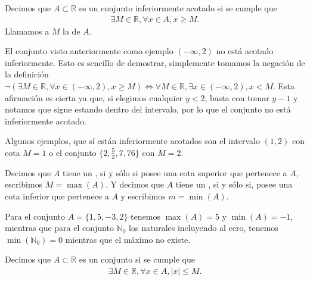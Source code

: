 \documentclass[12pt]{book}
\begin{document}
\begin{definitionenv}
     Decimos que $A\subset \mathbb{R}$ es un conjunto inferiormente acotado si se cumple que
    \begin{align*}
        \exists M\in \mathbb{R},\forall x \in A, x\ge M.
    \end{align*}
    Llamamos a $M$ la  de $A$.
\end{definitionenv}

\begin{exampleenv}
    El conjunto visto anteriormente como ejemplo $(-\infty,2)$ no está acotado inferiormente. Esto es sencillo de demostrar, simplemente tomamos la negación de la definición $\neg(\exists M\in \mathbb{R},\forall x \in (-\infty,2), x\ge M)\iff\forall M\in\mathbb{R},\exists x\in (-\infty,2), x< M$. Esta afirmación es cierta ya que, si elegimos cualquier $y<2$, basta con tomar $y-1$ y notamos que sigue estando dentro del intervalo, por lo que el conjunto no está inferiormente acotado.
\end{exampleenv}

\begin{exampleenv}
    Algunos ejemplos, que sí están inferiormente acotados son el intervalo $(1,2)$ con cota $M=1$ o el conjunto $\{2,\frac{5}{2},7,76\}$ con $M=2$.
\end{exampleenv}

\begin{definitionenv}
    Decimos que $A$ tiene un , si y sólo si posee una cota superior que pertenece a $A$, escribimos $M=\max(A)$. Y decimos que $A$ tiene un , si y sólo si, posee una cota inferior que pertenece a $A$ y escribimos $m=\min(A)$. 
\end{definitionenv}

\begin{exampleenv}
    Para el conjunto $A = \{1,5,-3,2\}$ tenemos $\max(A)=5$ y $\min(A)=-1$, mientras que para el conjunto $\mathbb{N}_0$ los naturales incluyendo al cero, tenemos $\min(\mathbb{N}_0)=0$ mientras que el máximo no existe.
\end{exampleenv}

\begin{definitionenv}
     Decimos que $A\subset \mathbb{R}$ es un conjunto  si se cumple que
    \begin{align*}
        \exists M\in \mathbb{R},\forall x \in A, |x|\leq M.
    \end{align*}
\end{definitionenv}
\end{document}
